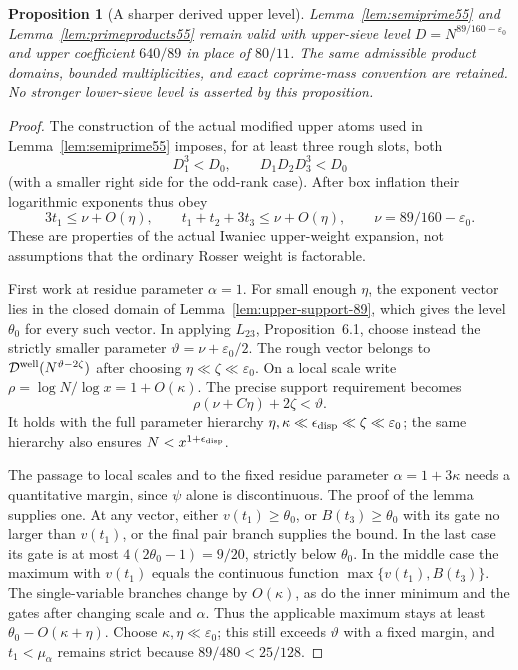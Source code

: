 \documentclass[11pt]{article}
\newtheorem{proposition}[theorem]{Proposition}
\begin{document}
\begin{proposition}[A sharper derived upper level]
\label{prop:upper-89}
Lemma~\ref{lem:semiprime55} and Lemma~\ref{lem:primeproducts55}
remain valid with upper-sieve level
$D=N^{89/160-\varepsilon_0}$ and upper coefficient $640/89$
in place of $80/11$. The same admissible product domains,
bounded multiplicities, and exact coprime-mass convention are retained.
No stronger lower-sieve level is asserted by this proposition.
\end{proposition}
\begin{proof}
The construction of the actual modified upper atoms used in
Lemma~\ref{lem:semiprime55} imposes, for at least three rough slots,
both
\[
 D_1^3<D_0,\qquad D_1D_2D_3^3<D_0
\]
(with a smaller right side for the odd-rank case).
After box inflation their logarithmic exponents thus obey
\[
 3t_1\le\nu+O(\eta),\qquad
 t_1+t_2+3t_3\le\nu+O(\eta),
 \qquad \nu=89/160-\varepsilon_0.
\]
These are properties of the actual Iwaniec upper-weight expansion,
not assumptions that the ordinary Rosser weight is factorable.

First work at residue parameter $\alpha=1$.
For small enough $\eta$, the exponent vector lies in the closed
domain of Lemma~\ref{lem:upper-support-89}, which gives the
level $\theta_0$ for every such vector. In applying
$L_{23}$, Proposition~6.1, choose instead the strictly smaller
parameter $\vartheta=\nu+\varepsilon_0/2$.
The rough vector belongs to
$\mathcal D^{\rm well}(N^{\vartheta-2\zeta})$ after choosing
$\eta\ll\zeta\ll\varepsilon_0$.
On a local scale write $\rho=\log N/\log x=1+O(\kappa)$.
The precise support requirement becomes
\[
 \rho(\nu+C\eta)+2\zeta<\vartheta.
\]
It holds with the full parameter hierarchy
$\eta,\kappa\ll\epsilon_{\rm disp}\ll\zeta\ll\varepsilon_0$;
the same hierarchy also ensures $N<x^{1+\epsilon_{\rm disp}}$.

The passage to local scales and to the fixed residue parameter
$\alpha=1+3\kappa$ needs a quantitative margin, since $\psi$
alone is discontinuous. The proof of the lemma supplies one.
At any vector, either $v(t_1)\ge\theta_0$, or
$B(t_3)\ge\theta_0$ with its gate no larger than $v(t_1)$,
or the final pair branch supplies the bound.
In the last case its gate is at most $4(2\theta_0-1)=9/20$,
strictly below $\theta_0$. In the middle case the maximum
with $v(t_1)$ equals the continuous function
$\max\{v(t_1),B(t_3)\}$.
The single-variable branches change by $O(\kappa)$, as do
the inner minimum and the gates after changing scale and
$\alpha$. Thus the applicable maximum stays at least
$\theta_0-O(\kappa+\eta)$.
Choose $\kappa,\eta\ll\varepsilon_0$; this still exceeds
$\vartheta$ with a fixed margin, and $t_1<\mu_\alpha$ remains
strict because $89/480<25/128$.


\end{proof}
\end{document}
